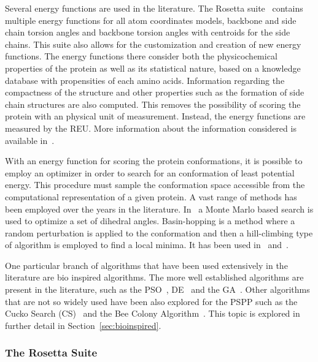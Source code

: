 Several energy functions are used in the literature. The Rosetta suite~\cite{rohl2004protein,kaufmann2010practically} contains multiple energy functions for all atom coordinates models, backbone and side chain torsion angles and backbone torsion angles with centroids for the side chains. This suite also allows for the customization and creation of new energy functions. The energy functions there consider both the physicochemical properties of the protein as well as its statistical nature, based on a knowledge database with propensities of each amino acids. Information regarding the compactness of the structure and other properties such as the formation of side chain structures are also computed. This removes the possibility of scoring the protein with an physical unit of measurement. Instead, the energy functions are measured by the \ac{REU}. More information about the information considered is available in~\cite{alford2017rosetta}.

With an energy function for scoring the protein conformations, it is possible to employ an optimizer in order to search for an conformation of least potential energy. This procedure must sample the conformation space accessible from the computational representation of a given protein. A vast range of methods has been employed over the years in the literature. In~\cite{li1987monte} a Monte Marlo based search is used to optimize a set of dihedral angles. Basin-hopping is a method where a random perturbation is applied to the conformation and then a hill-climbing type of algorithm is employed to find a local minima. It has been used in~\cite{prentiss2008protein} and~\cite{olson2012efficient}.

One particular branch of algorithms that have been used extensively in the literature are bio inspired algorithms. The more well established algorithms are present in the literature, such as the
\ac{PSO}~\cite{geng2017protein}, \ac{DE}~\cite{hao2017conformational} and the \ac{GA}~\cite{higgs2010genetic}. Other algorithms that are not so widely used have been also explored for the \ac{PSPP} such as the Cucko Search (CS)~\cite{ramyachitra2017modcsa} and the Bee Colony Algorithm~\cite{li2015balance}. This topic is explored in further detail in Section~\ref{sec:bioinspired}.

\subsubsection{The Rosetta Suite} \label{sec:rosetta}

